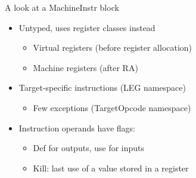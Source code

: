 \begin{frame}{A look at a MachineInstr block}

\begin{itemize}
    \item Untyped, uses register classes instead
    \begin{itemize}
        \item Virtual registers (before register allocation)
        \item Machine registers (after RA)
    \end{itemize}
    \item Target-specific instructions (LEG namespace)
    \begin{itemize}
        \item Few exceptions (TargetOpcode namespace)
    \end{itemize}
    \item Instruction operands have flags:
    \begin{itemize}
        \item Def for outputs, use for inputs
        \item Kill: last use of a value stored in a register
    \end{itemize}
\end{itemize}



\end{frame}
